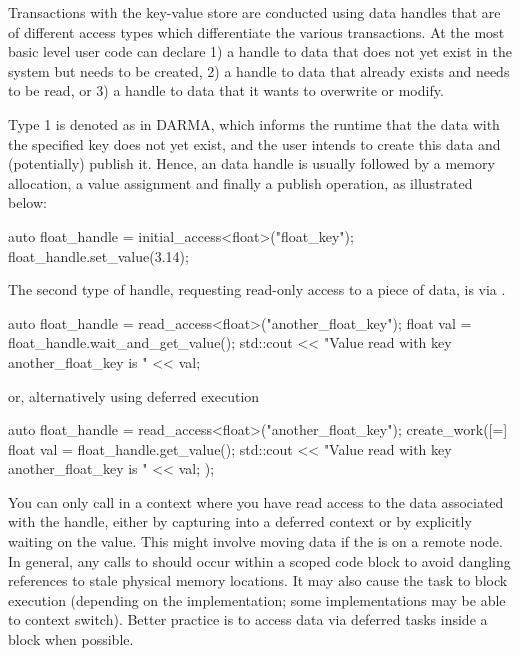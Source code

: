 Transactions with the \gls{key-value store} are conducted using data handles that are of different access types which differentiate the 
various transactions. 
At the most basic level user code can declare 
1) a handle to data that does not yet exist in the system
but needs to be created, 
2) a handle to data that already exists and needs to
be read, or 
3) a handle to data that it wants to overwrite or modify. 

Type 1 is denoted as  in DARMA, which informs the runtime that the data with the 
specified key does not yet exist, and the user intends to create this data and
(potentially) publish it.
Hence, an 
data handle is usually followed by a memory allocation, a value assignment and finally a publish operation, as illustrated below: 

\begin{CppCode}
auto float_handle = initial_access<float>("float_key");
float_handle.set_value(3.14);
\end{CppCode}
The second type of handle, requesting read-only access to a piece of data, is via . 

\begin{CppCode}
auto float_handle = read_access<float>("another_float_key");
{
  float val = float_handle.wait_and_get_value();
  std::cout << "Value read with key another_float_key is " << val;
}
\end{CppCode}
or, alternatively using deferred execution
\begin{CppCode}
auto float_handle = read_access<float>("another_float_key");
create_work([=]{
  float val = float_handle.get_value();
  std::cout << "Value read with key another_float_key is " << val;  
});
\end{CppCode}
You can only call  in a context where you have read access
to the data associated with the handle, either by capturing into a deferred
context or by explicitly waiting on the value.  This might involve moving data
if the  is on a remote node.
In general, any calls to  should occur within a scoped code block to avoid dangling references to stale physical memory locations.
It may also cause the task to block execution (depending on the implementation; some implementations may be able to context switch).
Better practice is to access data via deferred tasks inside a
 block when possible.

